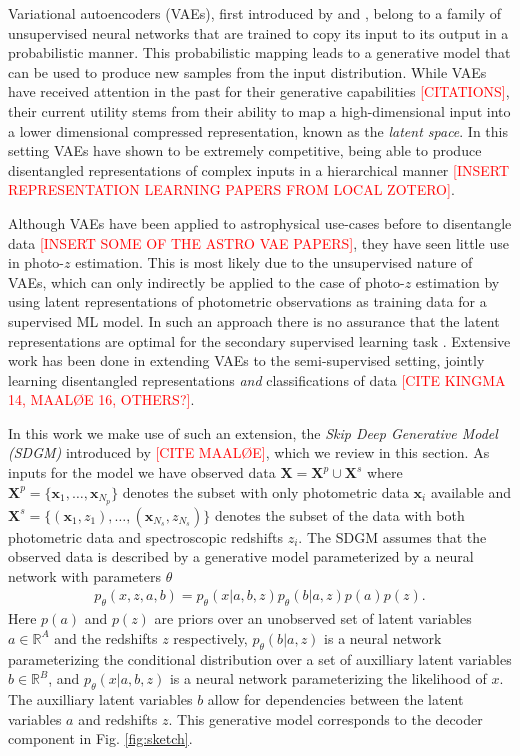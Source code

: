 Variational autoencoders (VAEs), first introduced by \cite{kingmaAutoEncodingVariationalBayes2022} and \cite{rezendeStochasticBackpropagationApproximate2014}, belong to a family of unsupervised neural networks that are trained to copy its input to its output in a probabilistic manner. This probabilistic mapping leads to a generative model that can be used to produce new samples from the input distribution. 
While VAEs have received attention in the past for their generative capabilities \textcolor{red}{[CITATIONS]}, their current utility stems from their ability to map a high-dimensional input into a lower dimensional compressed representation, known as the \textit{latent space}. In this setting VAEs have shown to be extremely competitive, being able to produce disentangled representations of complex inputs in a hierarchical manner \textcolor{red}{[INSERT REPRESENTATION LEARNING PAPERS FROM LOCAL ZOTERO]}. 

Although VAEs have been applied to astrophysical use-cases before to disentangle data \textcolor{red}{[INSERT SOME OF THE ASTRO VAE PAPERS]}, they have seen little use in photo-$z$ estimation. This is most likely due to the unsupervised nature of VAEs, which can only indirectly be applied to the case of photo-$z$ estimation by using latent representations of photometric observations as training data for a supervised ML model. In such an approach there is no assurance that the latent representations are optimal for the secondary supervised learning task \citep{kingmaSemiSupervisedLearningDeep2014}. Extensive work has been done in extending VAEs to the semi-supervised setting, jointly learning disentangled representations \textit{and} classifications of data \textcolor{red}{[CITE KINGMA 14, MAALØE 16, OTHERS?]}.

In this work we make use of such an extension, the \textit{Skip Deep Generative Model (SDGM)} introduced by \textcolor{red}{[CITE MAALØE]}, which we review in this section. As inputs for the model we have observed data $\mathbf{X} = \mathbf{X}^p \cup \mathbf{X}^s$ where $\mathbf{X}^p = \{ \mathbf{x}_1,\dots,\mathbf{x}_{N_p} \}$ denotes the subset with only photometric data $\mathbf{x}_i$ available and $\mathbf{X}^s = \{ (\mathbf{x}_1, z_1), \dots , (\mathbf{x}_{N_s}, z_{N_s}) \}$ denotes the subset of the data with both photometric data and spectroscopic redshifts $z_i$. The SDGM assumes that the observed data is described by a generative model parameterized by a neural network with parameters $\theta$ 
\begin{align}
    p_\theta(x, z, a, b) = p_\theta(x|a,b,z) p_\theta(b|a,z) p(a) p(z).    
\end{align}
Here $p(a)$ and $p(z)$ are priors over an unobserved set of latent variables $a\in\mathbb{R}^A$ and the redshifts $z$ respectively, $p_\theta(b|a,z)$ is a neural network parameterizing the conditional distribution over a set of auxilliary latent variables $b\in\mathbb{R}^B$, and $p_\theta(x|a,b,z)$ is a neural network parameterizing the likelihood of $x$. The auxilliary latent variables $b$ allow for dependencies between the latent variables $a$ and redshifts $z$. This generative model corresponds to the decoder component in Fig. \ref{fig:sketch}.

